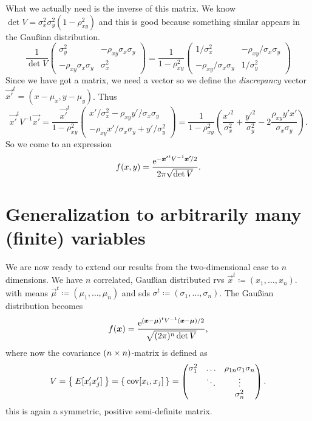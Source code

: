 What we actually need is the inverse of this matrix.
We know $\det V  = \sigma_x^2\sigma_y^2(1-\rho_{xy }^2)$ and this is good because something similar appears in the Gau\ss{}ian distribution.
\begin{equation}
	\frac{1}{\det V}
	\begin{pmatrix}
		\sigma_y^2	&-\rho_{xy}\sigma_x\sigma_y\\
		-\rho_{xy}\sigma_x\sigma_y &\sigma_x^2
	\end{pmatrix}
	=
	\frac{1}{1-\rho_{xy}^2}
	\begin{pmatrix}
		1/\sigma_x^2	&-\rho_{xy}/\sigma_x\sigma_y\\
		-\rho_{xy}/\sigma_x\sigma_y &1/\sigma_y^2
	\end{pmatrix}
\end{equation}
Since we have got a matrix, we need a vector so we define the \emph{discrepancy} vector $\vec{x'}^t = (x-\mu_x,y-\mu_y)$.
Thus
\begin{equation}
	\vec{x'}^tV^{-1}\vec{x'} = 
	\frac{\vec{x'}^t}{1-\rho_{xy}^2}
	\begin{pmatrix}
		x'/\sigma_x^2-\rho_{xy}y'/\sigma_x\sigma_y\\
		-\rho_{xy}x'/\sigma_x\sigma_y + y'/\sigma_y^2
	\end{pmatrix}
	=
	\frac{1}{1-\rho_{xy}^2}
	\left(
		\frac{x'^2}{\sigma_x^2} + \frac{y'^2}{\sigma_y^2} - 2 \frac{\rho_{xy}y'x'}{\sigma_x\sigma_y}
	\right).
\end{equation}
So we come to an expression
\begin{equation}
	f(x,y) = \frac{\mathrm{e}^{-\bm{{x'}}^tV^{-1}\bm{{x'}}\!/2}}{2\pi\sqrt{\det V}}.
\end{equation}


\section{Generalization to arbitrarily many (finite) variables}

We are now ready to extend our results from the two-dimensional case to $n$ dimensions.
We have $n$ correlated, Gau\ss{}ian distributed \acp{rv} $\vec{x}^t \coloneqq(x_1,\dots,x_n)$. with means $\vec{\mu}^t\coloneqq (\mu_1,\dots,\mu_n)$ and \acp{sd} $\sigma^t \coloneqq (\sigma_1,\dots,\sigma_n)$.
The Gau\ss{}ian distribution becomes
\begin{equation}
	f(\bm{{x}}) = \frac{\mathrm{e}^{(\bm{{x}}-\bm{{\mu}})^tV^{-1}(\bm{{x}}-\bm{{\mu}})/2}}{\sqrt{(2\pi)^n\det V}},
\end{equation}
where now the covariance $(n\times n)$-matrix is defined as
\begin{equation}
	V = \Set{E[x_i'x_j']} = \Set{\operatorname{cov}[x_i,x_j]}=
	\begin{pmatrix}
		\sigma_1^2	&\dots 	&\rho_{1n}\sigma_1\sigma_n\\
					  &\ddots		&\vdots \\
	   & &\sigma_n^2
	\end{pmatrix}.
\end{equation}
this is again a symmetric, positive semi-definite matrix.


